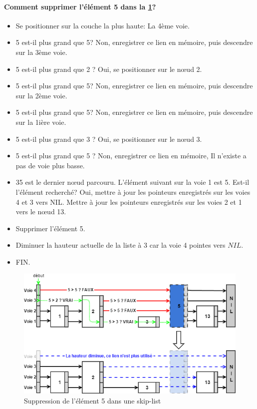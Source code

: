\documentclass[hidelinks,a4paper, 12pt]{article}
\begin{document}
	\paragraph*{Comment supprimer l'élément 5 dans la \cref{SkipDelete}?}
	\begin{itemize}
		\item Se positionner sur la couche la plus haute: La 4ème voie.
		\item 5 est-il plus grand que 5? Non, enregistrer ce lien en mémoire, puis descendre sur la 3ème voie.
		\item 5 est-il plus grand que 2 ? Oui, se positionner sur le nœud 2.
		\item 5 est-il plus grand que 5? Non, enregistrer ce lien en mémoire, puis descendre sur la 2ème voie.
		\item 5 est-il plus grand que 5? Non, enregistrer ce lien en mémoire, puis descendre sur la 1ière voie.
		\item 5 est-il plus grand que 3 ? Oui, se positionner sur le nœud 3.
		\item 5 est-il plus grand que 5 ? Non, enregistrer ce lien en mémoire, Il n'existe a pas de voie plus basse.
		\item35 est le dernier nœud parcouru. L'élément suivant sur la voie 1 est 5. Est-il l'élément recherché? Oui, mettre à jour les pointeurs enregistrés sur les voies 4 et 3 vers NIL. Mettre à jour les pointeurs enregistrés sur les voies 2 et 1 vers le nœud 13.
		\item Supprimer l'élément 5.
		\item Diminuer la hauteur actuelle de la liste à 3 car la voie 4 pointes vers $NIL$.
		\item FIN.
	\end{itemize}
	\begin{figure}[h]
		\includegraphics[width=\textwidth]{img/delete}
		\caption{Suppression de l'élément 5 dans une skip-list}
		\label{SkipDelete}
	\end{figure}
	
\end{document}
